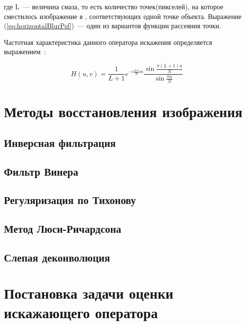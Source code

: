где L~--- величина смаза, то есть количество точек(пикселей), на которое сместилось изображение в , соответствующих одной точке объекта. Выражение (\ref{eq:horizontalBlurPsf})~--- один из вариантов функции рассеяния точки.

Частотная характеристика данного оператора искажения определяется выражением~\cite{iterableImageRestorationBiemonLangddeik}:

\begin{equation}\label{eq:horizontalBlurIRFourier}
H(u,v) = \frac{1}{L+1}e^{-i\frac{L\pi}{N}m}\frac{\sin\frac{\pi(L+1)u}{N}}{\sin\frac{\pi u}{N}}
\end{equation}


\section{Методы восстановления изображения}

\subsection{Инверсная фильтрация}
\subsection{Фильтр Винера}
\subsection{Регуляризация по Тихонову}
\subsection{Метод Люси-Ричардсона}
\subsection{Слепая деконволюция}


\section{Постановка задачи оценки искажающего оператора}

